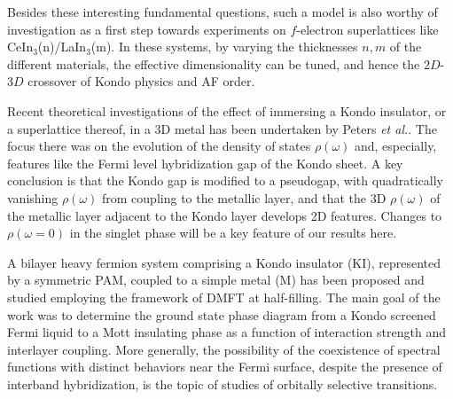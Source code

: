 \documentclass[pra,letterpaper,10pt,twocolumn]{revtex4}
\begin{document}

Besides these interesting fundamental questions, such a model is also
worthy of investigation as a first step towards experiments\cite{shishido10} on
$f$-electron superlattices like CeIn$_3$(n)/LaIn$_3$(m).  In these
systems, by varying the
thicknesses $n,m$ of the different materials, the effective
dimensionality can be tuned, and hence the $2D$-$3D$ crossover of Kondo
physics and AF order.  


Recent theoretical investigations of the effect of immersing a
Kondo insulator, or a superlattice thereof, in a 3D metal has been
undertaken by Peters {\it et al.}\cite{peters13}.  The focus there was on
the evolution of the density of states $\rho(\omega)$ and, especially,
features like the Fermi level hybridization gap of the Kondo sheet.  A
key conclusion is that the Kondo gap is modified to a pseudogap, with
quadratically vanishing $\rho(\omega)$ from coupling to the metallic
layer, and that the 3D $\rho(\omega)$ of the metallic layer adjacent to
the Kondo layer develops 2D features.  Changes to $\rho(\omega=0)$
in the singlet phase will be a key feature of our results here.

A bilayer heavy fermion system
comprising a Kondo insulator (KI), represented by a symmetric PAM,
coupled to a simple metal (M) has been proposed and studied
employing the framework of DMFT\cite{Sen16} at half-filling.  
The main goal of the work
was to determine the ground state phase diagram from a Kondo screened
Fermi liquid to a Mott insulating phase as a function of interaction
strength and interlayer coupling.  More generally, the possibility of
the coexistence of spectral functions with distinct behaviors near the
Fermi surface, despite the presence of interband hybridization, is the
topic of studies of orbitally selective
transitions\cite{liebsch04,arita05}.
\end{document}
